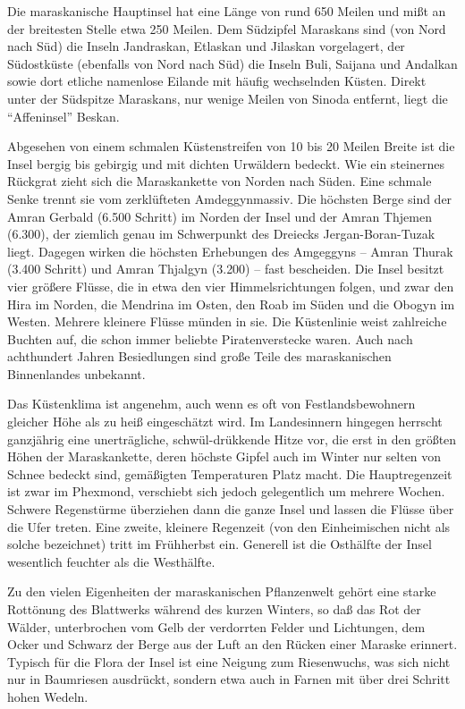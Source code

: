 Die maraskanische Hauptinsel hat eine Länge von rund 650 Meilen und mißt an der breitesten Stelle etwa 250 Meilen. Dem Südzipfel Maraskans sind (von Nord nach Süd) die Inseln Jandraskan, Etlaskan und Jilaskan vorgelagert, der Südostküste (ebenfalls von Nord nach Süd) die Inseln Buli, Saijana und Andalkan sowie dort etliche namenlose Eilande mit häufig wechselnden Küsten. Direkt unter der Südspitze Maraskans, nur wenige Meilen von Sinoda entfernt, liegt die ``Affeninsel'' Beskan.

Abgesehen von einem schmalen Küstenstreifen von 10 bis 20 Meilen Breite ist die Insel bergig bis gebirgig und mit dichten Urwäldern bedeckt. Wie ein steinernes Rückgrat zieht sich die Maraskankette von Norden nach Süden. Eine schmale Senke trennt sie vom zerklüfteten Amdeggynmassiv. Die höchsten Berge sind der Amran Gerbald (6.500 Schritt) im Norden der Insel und der Amran Thjemen (6.300), der ziemlich genau im Schwerpunkt des Dreiecks Jergan-Boran-Tuzak liegt. Dagegen wirken die höchsten Erhebungen des Amgeggyns -- Amran Thurak (3.400 Schritt) und Amran Thjalgyn (3.200) -- fast bescheiden. Die Insel besitzt vier größere Flüsse, die in etwa den vier Himmelsrichtungen folgen, und zwar den Hira im Norden, die Mendrina im Osten, den Roab im Süden und die Obogyn im Westen. Mehrere kleinere Flüsse münden in sie. Die Küstenlinie weist zahlreiche Buchten auf, die schon immer beliebte Piratenverstecke waren. Auch nach achthundert
Jahren Besiedlungen sind große Teile des maraskanischen Binnenlandes unbekannt.

Das Küstenklima ist angenehm, auch wenn es oft von Festlandsbewohnern gleicher Höhe als zu heiß eingeschätzt wird. Im Landesinnern hingegen herrscht ganzjährig eine unerträgliche, schwül-drükkende Hitze vor, die erst in den größten Höhen der Maraskankette, deren höchste Gipfel auch im Winter nur selten von Schnee bedeckt sind, gemäßigten Temperaturen Platz macht. Die Hauptregenzeit ist zwar im Phexmond, verschiebt sich jedoch gelegentlich um mehrere Wochen. Schwere Regenstürme überziehen dann die ganze Insel und lassen die Flüsse über die Ufer treten. Eine zweite, kleinere Regenzeit (von den Einheimischen nicht als solche bezeichnet) tritt im Frühherbst ein. Generell ist die Osthälfte der Insel wesentlich feuchter als
die Westhälfte.

Zu den vielen Eigenheiten der maraskanischen Pflanzenwelt gehört eine starke Rottönung des Blattwerks während des kurzen Winters, so daß das Rot der Wälder, unterbrochen vom Gelb der verdorrten Felder und Lichtungen, dem Ocker und Schwarz der Berge aus der Luft an den Rücken einer Maraske erinnert. Typisch für die Flora der Insel ist eine Neigung zum Riesenwuchs, was sich nicht nur in Baumriesen ausdrückt, sondern etwa auch in Farnen mit über drei Schritt hohen Wedeln.

